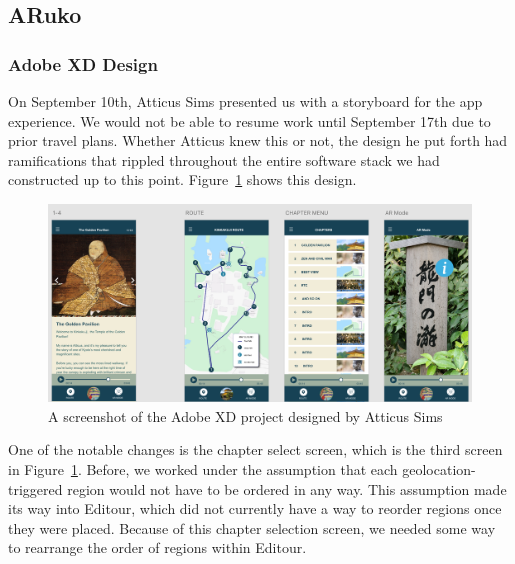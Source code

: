 \documentclass[a4paper, 10pt, american, titlepage]{article}
\begin{document}
\subsection{ARuko}
\label{sec:aruko}

\subsubsection{Adobe XD Design}
\label{sec:adobeXdDesign}
On September 10th, Atticus Sims presented us with a storyboard for the app
experience. We would not be able to resume work until September 17th due to
prior travel plans. Whether Atticus knew this or not, the design he put forth
had ramifications that rippled throughout the entire software stack we had
constructed up to this point. Figure~\ref{fig:adobeXdDesign} shows this design.

\begin{figure}[h]
	\centering
	\includegraphics[width=1\textwidth]{adobe-xd-design.png}
	\caption[A screenshot of the Adobe XD project designed by Atticus Sims]
    {A screenshot of the Adobe XD project designed by Atticus Sims}
	\label{fig:adobeXdDesign}
\end{figure}

One of the notable changes is the chapter select screen, which is the third
screen in Figure~\ref{fig:adobeXdDesign}. Before, we worked under the assumption
that each geolocation-triggered region would not have to be ordered in any way.
This assumption made its way into Editour, which did not currently have a way
to reorder regions once they were placed. Because of this chapter selection
screen, we needed some way to rearrange the order of regions within Editour.
\end{document}
